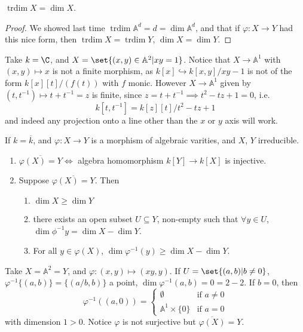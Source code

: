 \documentclass{article}
\newcommand{\A}{\mathbb{A}}
\DeclareMathOperator{\trdim}{trdim}
\begin{document}
\begin{cor}
    $\trdim X = \dim X$.
\end{cor}
\begin{proof}
    We showed last time $\trdim \A^d = d = \dim \A^d$, and that if $\varphi: X \to Y$ had this nice form, then $\trdim X = \trdim Y$, $\dim X = \dim Y$.
\end{proof}
\begin{eg}
    Take $k = \C$, and $X = \set{(x, y) \in \A^2 | x y = 1}$. Notice that $X \to \A^1$ with $(x, y) \mapsto x$ is not a finite morphism, as $k[x] \hookrightarrow k[x, y] /xy-1$ is not of the form $k[x][t]/(f(t))$ with $f$ monic.
    However $X \to \A^1$ given by $(t, t^{-1}) \mapsto t + t^{-1} = z$ is finite, since $z = t+t^{-1} \implies t^2 - tz + 1 = 0$, i.e.\
    \begin{equation}
        k[t, t^{-1}] = k[z][t]/t^2-tz+1
    \end{equation}
    and indeed any projection onto a line other than the $x$ or $y$ axis will work.
\end{eg}
\begin{thm}
    If $k = \overline{k}$, and $\varphi: X \to Y$ is a morphism of algebraic varities, and $X$, $Y$ irreducible.
    \begin{enumerate}[label=(\alph*)]
        \item $\overline{\varphi(X) = Y} \iff$ algebra homomorphism $k[Y] \to k[X]$ is injective.
        \item Suppose $\overline{\varphi(X) = Y}$. Then
            \begin{enumerate}[label=(\roman*)]
                \item $\dim X \geq \dim Y$
                \item there exists an open subset $U \subseteq Y$, non-empty such that $\forall y \in U$, $\dim \phi^{-1} y = \dim X - \dim Y$.
                \item For all $y \in \varphi(X)$, $\dim \varphi^{-1}(y) \geq \dim X - \dim Y$.
            \end{enumerate}
    \end{enumerate}
\end{thm}
\begin{eg}
    Take $X = \A^2 = Y$, and $\varphi: (x, y) \mapsto (xy, y)$.
    If $U = \set{(a, b) | b \neq 0}$, $\varphi^{-1}\{(a, b)\} = \{(a/b, b)\}$ a point, $\dim \varphi^{-1}(a, b) = 0 = 2- 2$.
    If $b = 0$, then
    \begin{equation}
        \varphi^{-1}((a, 0)) =
        \begin{cases}
            \emptyset & \text{if } a \neq 0 \\
            \A^1 \times \{0\} & \text{if } a = 0
        \end{cases}
    \end{equation}
    with dimension $1 > 0$. Notice $\varphi$ is not surjective but $\overline{\varphi(X)} = Y$.
\end{eg}
\end{document}
